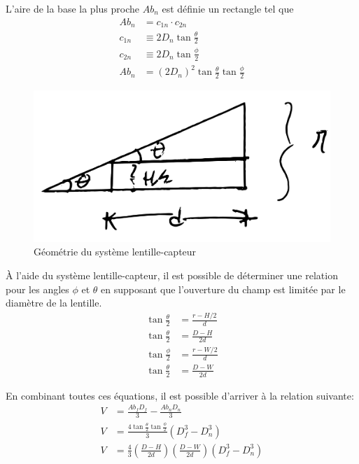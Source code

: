 L'aire de la base la plus proche $Ab_n$ est définie un rectangle tel que
\begin{align}
    Ab_n &= c_{1n} \cdot c_{2n}\\
    c_{1n} &\equiv 2D_n \tan{\frac{\theta}{2}}\\
    c_{2n} &\equiv 2D_n \tan{\frac{\phi}{2}}\\
    Ab_n &= (2 D_n)^2 \tan{\frac{\theta}{2}} \tan{\frac{\phi}{2}}
    \label{eq:base_proche}
\end{align}


\begin{figure}[!htb]
    \centering
    \includegraphics[width=0.5\linewidth]{fig/camera_custom_angle_vect.png}
    \caption{Géométrie du système lentille-capteur}
    \label{fig:lentille_capteur}
\end{figure}

À l'aide du système lentille-capteur, il est possible de déterminer une relation pour les angles $\phi$ et $\theta$ en supposant que l'ouverture du champ est limitée par le diamètre de la lentille.
\begin{align}
    \tan{\frac{\theta}{2}} &= \frac{r-H/2}{d}\\
    \tan{\frac{\theta}{2}} &= \frac{D-H}{2d}\\
    \tan{\frac{\phi}{2}} &= \frac{r-W/2}{d}\\
    \tan{\frac{\theta}{2}} &= \frac{D-W}{2d}
    \label{eq:angles}
\end{align}

En combinant toutes ces équations, il est possible d'arriver à la relation suivante:
\begin{align}
    V &= \frac{Ab_f D_f}{3} - \frac{Ab_n D_n}{3}\\ 
    V &= \frac{4 \tan{\frac{\theta}{2}}  \tan{\frac{\phi}{2}}}{3} \left( D_f^3 - D_n^3\right)\\
    V &= \frac{4}{3} \left(\frac{D-H}{2d} \right) \left(\frac{D-W}{2d} \right) \left( D_f^3 - D_n^3\right)
    \label{eq:volume_imagerie}
\end{align}

